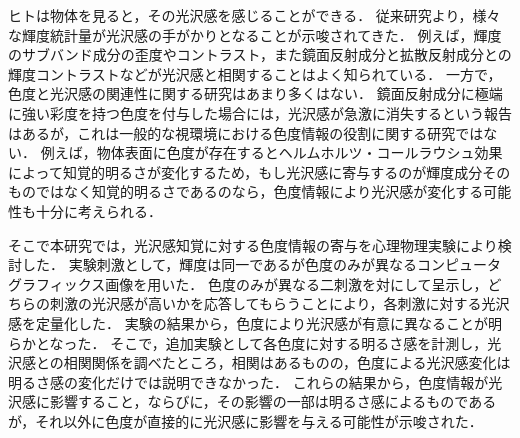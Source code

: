 ヒトは物体を見ると，その光沢感を感じることができる．
従来研究より，様々な輝度統計量が光沢感の手がかりとなることが示唆されてきた．
例えば，輝度のサブバンド成分の歪度やコントラスト，また鏡面反射成分と拡散反射成分との輝度コントラストなどが光沢感と相関することはよく知られている．
一方で，色度と光沢感の関連性に関する研究はあまり多くはない．
鏡面反射成分に極端に強い彩度を持つ色度を付与した場合には，光沢感が急激に消失するという報告はあるが，これは一般的な視環境における色度情報の役割に関する研究ではない．
例えば，物体表面に色度が存在するとヘルムホルツ・コールラウシュ効果によって知覚的明るさが変化するため，もし光沢感に寄与するのが輝度成分そのものではなく知覚的明るさであるのなら，色度情報により光沢感が変化する可能性も十分に考えられる．

そこで本研究では，光沢感知覚に対する色度情報の寄与を心理物理実験により検討した．
実験刺激として，輝度は同一であるが色度のみが異なるコンピュータグラフィックス画像を用いた．
色度のみが異なる二刺激を対にして呈示し，どちらの刺激の光沢感が高いかを応答してもらうことにより，各刺激に対する光沢感を定量化した．
実験の結果から，色度により光沢感が有意に異なることが明らかとなった．
そこで，追加実験として各色度に対する明るさ感を計測し，光沢感との相関関係を調べたところ，相関はあるものの，色度による光沢感変化は明るさ感の変化だけでは説明できなかった．
これらの結果から，色度情報が光沢感に影響すること，ならびに，その影響の一部は明るさ感によるものであるが，それ以外に色度が直接的に光沢感に影響を与える可能性が示唆された．
